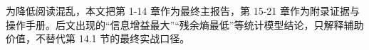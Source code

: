 为降低阅读混乱，本文把第 1-14 章作为最终主报告，第 15-21 章作为附录证据与操作手册。后文出现的“信息增益最大”“残余熵最低”等统计模型结论，只解释辅助价值，不替代第 14.1 节的最终实战口径。
